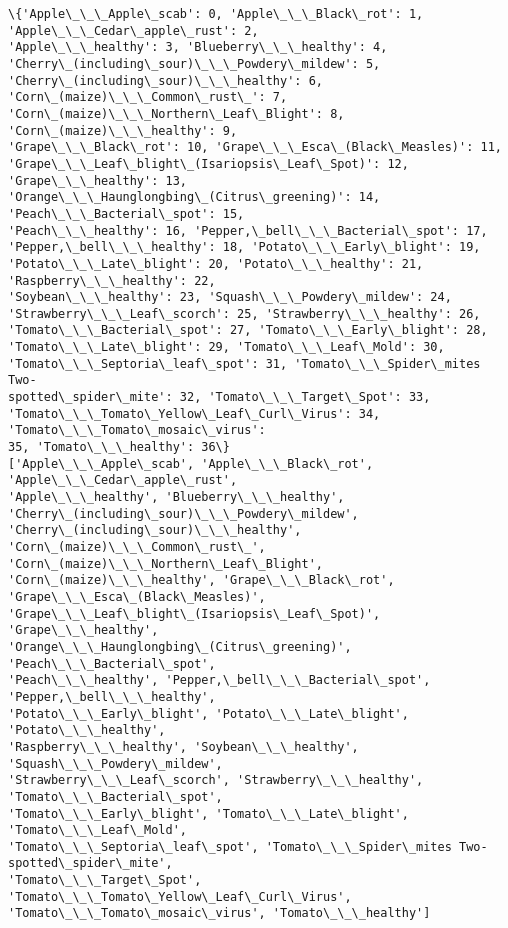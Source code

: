 \documentclass[11pt]{article}
\begin{document}
    \begin{Verbatim}[commandchars=\\\{\}]
\{'Apple\_\_\_Apple\_scab': 0, 'Apple\_\_\_Black\_rot': 1, 'Apple\_\_\_Cedar\_apple\_rust': 2,
'Apple\_\_\_healthy': 3, 'Blueberry\_\_\_healthy': 4,
'Cherry\_(including\_sour)\_\_\_Powdery\_mildew': 5,
'Cherry\_(including\_sour)\_\_\_healthy': 6, 'Corn\_(maize)\_\_\_Common\_rust\_': 7,
'Corn\_(maize)\_\_\_Northern\_Leaf\_Blight': 8, 'Corn\_(maize)\_\_\_healthy': 9,
'Grape\_\_\_Black\_rot': 10, 'Grape\_\_\_Esca\_(Black\_Measles)': 11,
'Grape\_\_\_Leaf\_blight\_(Isariopsis\_Leaf\_Spot)': 12, 'Grape\_\_\_healthy': 13,
'Orange\_\_\_Haunglongbing\_(Citrus\_greening)': 14, 'Peach\_\_\_Bacterial\_spot': 15,
'Peach\_\_\_healthy': 16, 'Pepper,\_bell\_\_\_Bacterial\_spot': 17,
'Pepper,\_bell\_\_\_healthy': 18, 'Potato\_\_\_Early\_blight': 19,
'Potato\_\_\_Late\_blight': 20, 'Potato\_\_\_healthy': 21, 'Raspberry\_\_\_healthy': 22,
'Soybean\_\_\_healthy': 23, 'Squash\_\_\_Powdery\_mildew': 24,
'Strawberry\_\_\_Leaf\_scorch': 25, 'Strawberry\_\_\_healthy': 26,
'Tomato\_\_\_Bacterial\_spot': 27, 'Tomato\_\_\_Early\_blight': 28,
'Tomato\_\_\_Late\_blight': 29, 'Tomato\_\_\_Leaf\_Mold': 30,
'Tomato\_\_\_Septoria\_leaf\_spot': 31, 'Tomato\_\_\_Spider\_mites Two-
spotted\_spider\_mite': 32, 'Tomato\_\_\_Target\_Spot': 33,
'Tomato\_\_\_Tomato\_Yellow\_Leaf\_Curl\_Virus': 34, 'Tomato\_\_\_Tomato\_mosaic\_virus':
35, 'Tomato\_\_\_healthy': 36\}
['Apple\_\_\_Apple\_scab', 'Apple\_\_\_Black\_rot', 'Apple\_\_\_Cedar\_apple\_rust',
'Apple\_\_\_healthy', 'Blueberry\_\_\_healthy',
'Cherry\_(including\_sour)\_\_\_Powdery\_mildew', 'Cherry\_(including\_sour)\_\_\_healthy',
'Corn\_(maize)\_\_\_Common\_rust\_', 'Corn\_(maize)\_\_\_Northern\_Leaf\_Blight',
'Corn\_(maize)\_\_\_healthy', 'Grape\_\_\_Black\_rot', 'Grape\_\_\_Esca\_(Black\_Measles)',
'Grape\_\_\_Leaf\_blight\_(Isariopsis\_Leaf\_Spot)', 'Grape\_\_\_healthy',
'Orange\_\_\_Haunglongbing\_(Citrus\_greening)', 'Peach\_\_\_Bacterial\_spot',
'Peach\_\_\_healthy', 'Pepper,\_bell\_\_\_Bacterial\_spot', 'Pepper,\_bell\_\_\_healthy',
'Potato\_\_\_Early\_blight', 'Potato\_\_\_Late\_blight', 'Potato\_\_\_healthy',
'Raspberry\_\_\_healthy', 'Soybean\_\_\_healthy', 'Squash\_\_\_Powdery\_mildew',
'Strawberry\_\_\_Leaf\_scorch', 'Strawberry\_\_\_healthy', 'Tomato\_\_\_Bacterial\_spot',
'Tomato\_\_\_Early\_blight', 'Tomato\_\_\_Late\_blight', 'Tomato\_\_\_Leaf\_Mold',
'Tomato\_\_\_Septoria\_leaf\_spot', 'Tomato\_\_\_Spider\_mites Two-spotted\_spider\_mite',
'Tomato\_\_\_Target\_Spot', 'Tomato\_\_\_Tomato\_Yellow\_Leaf\_Curl\_Virus',
'Tomato\_\_\_Tomato\_mosaic\_virus', 'Tomato\_\_\_healthy']
    \end{Verbatim}
\end{document}

